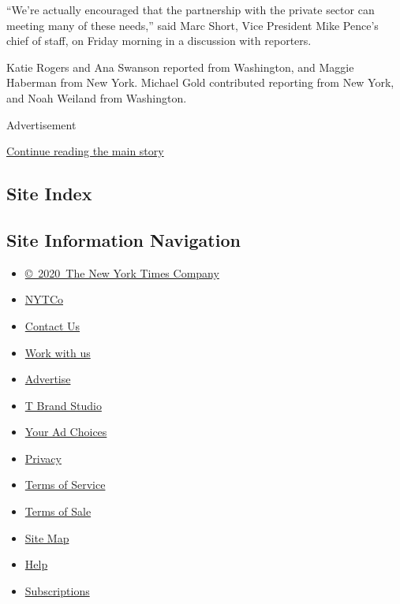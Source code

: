 ``We're actually encouraged that the partnership with the private sector
can meeting many of these needs,'' said Marc Short, Vice President Mike
Pence's chief of staff, on Friday morning in a discussion with
reporters.

Katie Rogers and Ana Swanson reported from Washington, and Maggie
Haberman from New York. Michael Gold contributed reporting from New
York, and Noah Weiland from Washington.

Advertisement

\protect\hyperlink{after-bottom}{Continue reading the main story}

\hypertarget{site-index}{%
\subsection{Site Index}\label{site-index}}

\hypertarget{site-information-navigation}{%
\subsection{Site Information
Navigation}\label{site-information-navigation}}

\begin{itemize}
\tightlist
\item
  \href{https://help.nytimes3xbfgragh.onion/hc/en-us/articles/115014792127-Copyright-notice}{©~2020~The
  New York Times Company}
\end{itemize}

\begin{itemize}
\tightlist
\item
  \href{https://www.nytco.com/}{NYTCo}
\item
  \href{https://help.nytimes3xbfgragh.onion/hc/en-us/articles/115015385887-Contact-Us}{Contact
  Us}
\item
  \href{https://www.nytco.com/careers/}{Work with us}
\item
  \href{https://nytmediakit.com/}{Advertise}
\item
  \href{http://www.tbrandstudio.com/}{T Brand Studio}
\item
  \href{https://www.nytimes3xbfgragh.onion/privacy/cookie-policy\#how-do-i-manage-trackers}{Your
  Ad Choices}
\item
  \href{https://www.nytimes3xbfgragh.onion/privacy}{Privacy}
\item
  \href{https://help.nytimes3xbfgragh.onion/hc/en-us/articles/115014893428-Terms-of-service}{Terms
  of Service}
\item
  \href{https://help.nytimes3xbfgragh.onion/hc/en-us/articles/115014893968-Terms-of-sale}{Terms
  of Sale}
\item
  \href{https://spiderbites.nytimes3xbfgragh.onion}{Site Map}
\item
  \href{https://help.nytimes3xbfgragh.onion/hc/en-us}{Help}
\item
  \href{https://www.nytimes3xbfgragh.onion/subscription?campaignId=37WXW}{Subscriptions}
\end{itemize}
